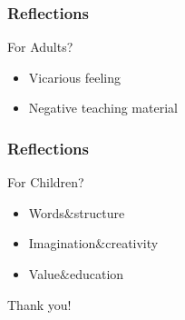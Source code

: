 \documentclass{beamer}
\begin{document}
\begin{frame}
    \frametitle{Reflections}
    \begin{block}{For Adults?}
        \begin{itemize}
            \item Vicarious feeling
            \item Negative teaching material
        \end{itemize}
    \end{block}
\end{frame}

\begin{frame}
    \frametitle{Reflections}
    \begin{block}{For Children?}
        \begin{itemize}
            \item Words$\&$structure
            \item Imagination$\&$creativity
            \item Value$\&$education
        \end{itemize}
    \end{block}
\end{frame}


\begin{frame}
    \Huge{\centerline{Thank you!}}
\end{frame}
\end{document}
